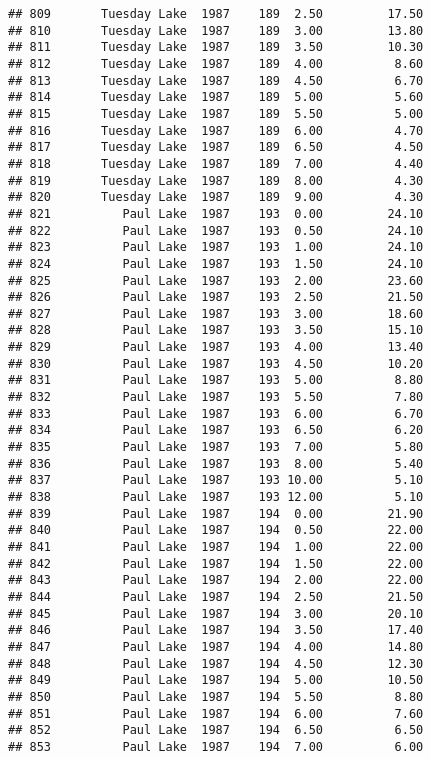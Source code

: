 \documentclass[
]{article}
\begin{document}
\begin{verbatim}
## 809       Tuesday Lake  1987    189  2.50         17.50
## 810       Tuesday Lake  1987    189  3.00         13.80
## 811       Tuesday Lake  1987    189  3.50         10.30
## 812       Tuesday Lake  1987    189  4.00          8.60
## 813       Tuesday Lake  1987    189  4.50          6.70
## 814       Tuesday Lake  1987    189  5.00          5.60
## 815       Tuesday Lake  1987    189  5.50          5.00
## 816       Tuesday Lake  1987    189  6.00          4.70
## 817       Tuesday Lake  1987    189  6.50          4.50
## 818       Tuesday Lake  1987    189  7.00          4.40
## 819       Tuesday Lake  1987    189  8.00          4.30
## 820       Tuesday Lake  1987    189  9.00          4.30
## 821          Paul Lake  1987    193  0.00         24.10
## 822          Paul Lake  1987    193  0.50         24.10
## 823          Paul Lake  1987    193  1.00         24.10
## 824          Paul Lake  1987    193  1.50         24.10
## 825          Paul Lake  1987    193  2.00         23.60
## 826          Paul Lake  1987    193  2.50         21.50
## 827          Paul Lake  1987    193  3.00         18.60
## 828          Paul Lake  1987    193  3.50         15.10
## 829          Paul Lake  1987    193  4.00         13.40
## 830          Paul Lake  1987    193  4.50         10.20
## 831          Paul Lake  1987    193  5.00          8.80
## 832          Paul Lake  1987    193  5.50          7.80
## 833          Paul Lake  1987    193  6.00          6.70
## 834          Paul Lake  1987    193  6.50          6.20
## 835          Paul Lake  1987    193  7.00          5.80
## 836          Paul Lake  1987    193  8.00          5.40
## 837          Paul Lake  1987    193 10.00          5.10
## 838          Paul Lake  1987    193 12.00          5.10
## 839          Paul Lake  1987    194  0.00         21.90
## 840          Paul Lake  1987    194  0.50         22.00
## 841          Paul Lake  1987    194  1.00         22.00
## 842          Paul Lake  1987    194  1.50         22.00
## 843          Paul Lake  1987    194  2.00         22.00
## 844          Paul Lake  1987    194  2.50         21.50
## 845          Paul Lake  1987    194  3.00         20.10
## 846          Paul Lake  1987    194  3.50         17.40
## 847          Paul Lake  1987    194  4.00         14.80
## 848          Paul Lake  1987    194  4.50         12.30
## 849          Paul Lake  1987    194  5.00         10.50
## 850          Paul Lake  1987    194  5.50          8.80
## 851          Paul Lake  1987    194  6.00          7.60
## 852          Paul Lake  1987    194  6.50          6.50
## 853          Paul Lake  1987    194  7.00          6.00

\end{verbatim}
\end{document}
